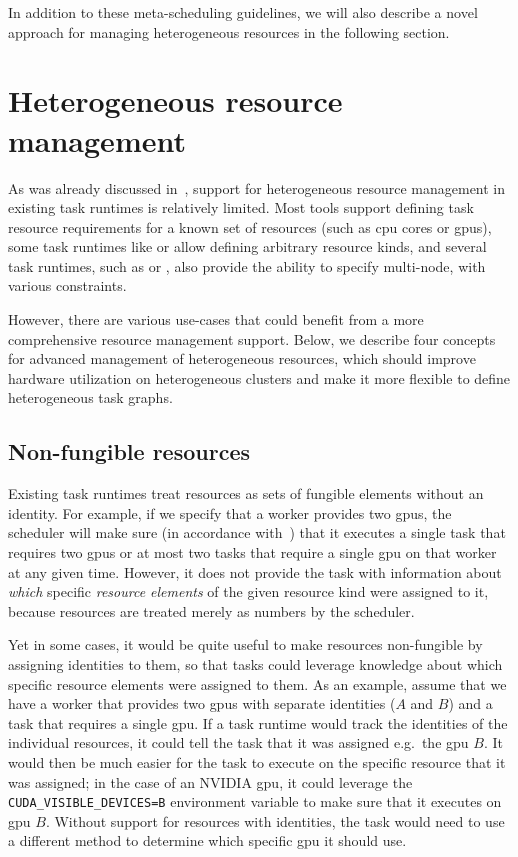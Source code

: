 In addition to these meta-scheduling guidelines, we will also describe a novel approach for
managing heterogeneous resources in the following section.

\section{Heterogeneous resource management}
\label{sec:heterogeneous-resources}
As was already discussed in~, support for heterogeneous resource management
in existing task runtimes is relatively limited. Most tools support defining task resource
requirements for a known set of resources (such as \gls{cpu} cores or
\glspl{gpu}), some task runtimes like \dask{} or
\snakemake{} allow defining arbitrary resource kinds, and several task runtimes, such as
\pycompss{} or \ray{}, also provide the ability to specify multi-node,
with various constraints.

However, there are various use-cases that could benefit from a more comprehensive resource
management support. Below, we describe four concepts for advanced management of heterogeneous
resources, which should improve hardware utilization on heterogeneous clusters and make it more
flexible to define heterogeneous task graphs.

\subsection{Non-fungible resources}
Existing task runtimes treat resources as sets of fungible elements without an identity. For
example, if we specify that a \dask{} worker provides two \glspl{gpu},
the \dask{} scheduler will make sure (in accordance with~)
that it executes a single task that requires two \glspl{gpu} or at most two tasks that
require a single \gls{gpu} on that worker at any given time. However, it does not
provide the task with information about \emph{which} specific \emph{resource elements} of
the given resource kind were assigned to it, because resources are treated merely as numbers by the
\dask{} scheduler.

Yet in some cases, it would be quite useful to make resources non-fungible by assigning identities
to them, so that tasks could leverage knowledge about which specific resource elements were
assigned to them. As an example, assume that we have a worker that provides two
\glspl{gpu} with separate identities ($A$ and
$B$) and a task that requires a single \gls{gpu}. If a task
runtime would track the identities of the individual resources, it could tell the task that it was
assigned e.g.\ the \gls{gpu} $B$. It would then be much easier for
the task to execute on the specific resource that it was assigned; in the case of an NVIDIA
\gls{gpu}, it could leverage the \texttt{CUDA\_VISIBLE\_DEVICES=B} environment variable to make
sure that it executes on \gls{gpu} $B$. Without support for
resources with identities, the task would need to use a different method to determine which
specific \gls{gpu} it should use.

